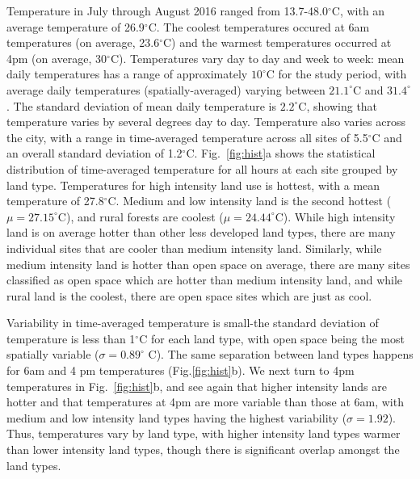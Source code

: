 \documentclass[draft,linenumbers]{agujournal}
\begin{document}
Temperature in July through August 2016 ranged from 13.7-48.0$^\circ$C, with an average temperature of 26.9$^\circ$C. The coolest temperatures occured at 6am temperatures (on average, 23.6$^\circ$C) and the warmest temperatures occurred at 4pm (on average,  30$^\circ$C). 
Temperatures vary day to day and week to week: mean daily temperatures has a range of approximately $10^\circ$C for the study period, with average daily temperatures (spatially-averaged) varying between $21.1^\circ$C and $31.4^\circ$. The standard deviation of mean daily temperature is $2.2^\circ$C, showing that temperature varies by several degrees day to day. 
Temperature also varies across the city, with a range in time-averaged temperature across all sites of 5.5$^\circ$C and an overall standard deviation of 1.2$^\circ$C. Fig.~\ref{fig:hist}a shows the statistical distribution of time-averaged temperature for all hours at each site grouped by land type. 
Temperatures %
for high intensity land use is hottest, with a mean temperature of 27.8$^\circ$C. Medium and low intensity land is the second hottest ($\mu = 27.15^\circ$C), and rural forests are coolest ($\mu = 24.44^\circ$C). While high intensity land is on average hotter than other less developed land types, there are many individual sites that are cooler than medium intensity land. Similarly, while medium intensity land is hotter than open space on average, there are many sites classified as open space which are hotter than medium intensity land, and while rural land is the coolest, there are open space sites which are just as cool. 

Variability in time-averaged temperature is small-the standard deviation of temperature is less than 1$^\circ$C for each land type, with open space being the most spatially variable ($\sigma = 0.89^\circ$ C). 
The same separation between land types happens for 6am and 4 pm temperatures (Fig.\ref{fig:hist}b).
 We next turn to 4pm temperatures in Fig.~\ref{fig:hist}b, and see again that higher intensity lands are hotter and that temperatures at 4pm are more variable than those at 6am, with medium and low intensity land types having the highest variability ($\sigma = 1.92$). 
Thus, temperatures vary by land type, with higher intensity land types  warmer than lower intensity land types, 
though there is significant overlap amongst the land types.
\end{document}
